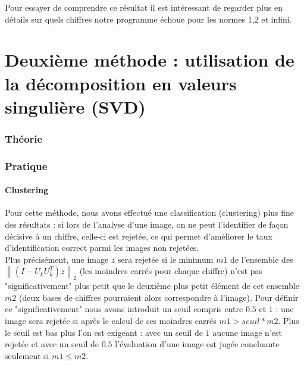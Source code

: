 \documentclass[a4paper,11pt,twoside]{report}
\newcommand{\norm}[1]{\left\lVert#1\right\rVert} %
\begin{document}
Pour essayer de comprendre ce résultat il est intéressant de regarder plus en détails sur quels chiffres notre programme échoue pour les normes 1,2 et infini.





\chapter{Deuxième méthode : utilisation de la décomposition en valeurs singulière (SVD)}
\subsection{Théorie}
\subsection{Pratique}
\subsubsection{Clustering}%
Pour cette méthode, nous avons effectué une classification (clustering) plus fine des résultats : si lors de l'analyse d'une image, on ne peut l'identifier de façon décisive à un chiffre, celle-ci est rejetée, ce qui permet d'améliorer le taux d'identification correct parmi les images non rejetées. \\Plus précisément, une image $z$ sera rejetée si le minimum $m1$ de l'ensemble des $ \norm{(I-U_{k}U_{k}^{T})z}_{2}$ (les moindres carrés pour chaque chiffre) n'est pas "significativement" plus petit que le deuxième plus petit élément de cet ensemble $m2$ (deux bases de chiffres pourraient alors correspondre à l'image). Pour définir ce "significativement" nous avons introduit un seuil compris entre $0.5$ et $1$ : une image sera rejetée si après le calcul de ses moindres carrés $m1>seuil*m2$. Plus le seuil est bas plus l'on est exigeant : avec un seuil de $1$ aucune image n'est rejetée et avec un seuil de $0.5$ l'évaluation d'une image est jugée concluante seulement si $m1\leq m2$.\\
\end{document}

